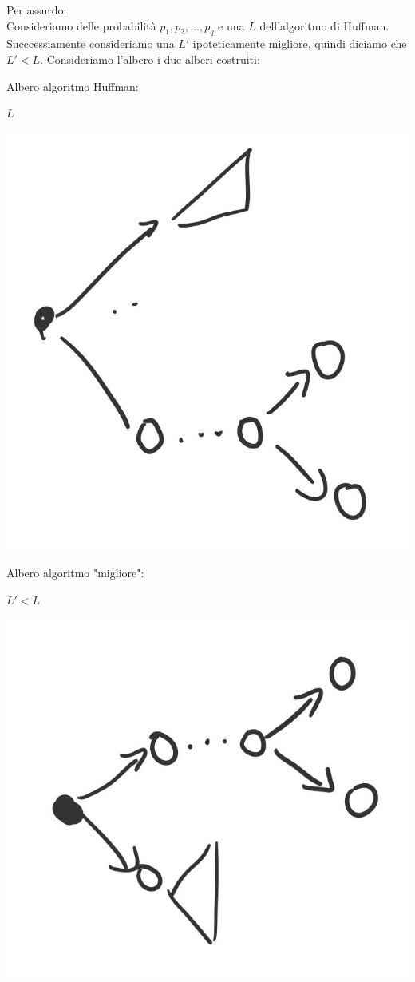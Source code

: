 \begin{dimostrazione}
	Per assurdo:\\
	Consideriamo delle probabilità $p_1, p_2, ... , p_q$ e una $L$ dell'algoritmo di Huffman. Succcessiamente consideriamo una $L'$ ipoteticamente migliore, quindi diciamo che $L'<L$.
	Consideriamo l'albero i due alberi costruiti:
	\begin{multicols}{2}
		Albero algoritmo Huffman:\\
		\begin{center} $L$ \end{center}
		\begin{Figure}
			\centering
			\includegraphics[width=0.7\linewidth]{immagini/img19}
		\end{Figure}
		
		\columnbreak
		
		Albero algoritmo "migliore":\\
	    \begin{center}	$L'<L$ \end{center}
		\begin{Figure}
			\centering
			\includegraphics[width=0.7\linewidth]{immagini/img20}
		\end{Figure}
	\end{multicols}


\end{dimostrazione}
